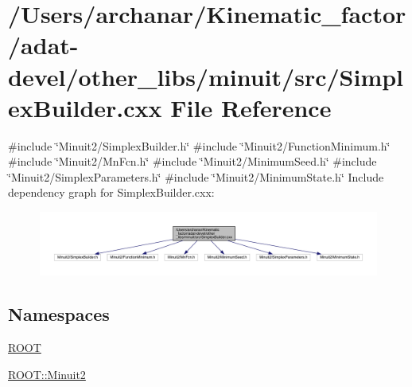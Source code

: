 \hypertarget{adat-devel_2other__libs_2minuit_2src_2SimplexBuilder_8cxx}{}\section{/\+Users/archanar/\+Kinematic\+\_\+factor/adat-\/devel/other\+\_\+libs/minuit/src/\+Simplex\+Builder.cxx File Reference}
\label{adat-devel_2other__libs_2minuit_2src_2SimplexBuilder_8cxx}
{\ttfamily \#include \char`\"{}Minuit2/\+Simplex\+Builder.\+h\char`\"{}}\newline
{\ttfamily \#include \char`\"{}Minuit2/\+Function\+Minimum.\+h\char`\"{}}\newline
{\ttfamily \#include \char`\"{}Minuit2/\+Mn\+Fcn.\+h\char`\"{}}\newline
{\ttfamily \#include \char`\"{}Minuit2/\+Minimum\+Seed.\+h\char`\"{}}\newline
{\ttfamily \#include \char`\"{}Minuit2/\+Simplex\+Parameters.\+h\char`\"{}}\newline
{\ttfamily \#include \char`\"{}Minuit2/\+Minimum\+State.\+h\char`\"{}}\newline
Include dependency graph for Simplex\+Builder.\+cxx\+:
\nopagebreak
\begin{figure}[H]
\begin{center}
\leavevmode
\includegraphics[width=350pt]{de/d41/adat-devel_2other__libs_2minuit_2src_2SimplexBuilder_8cxx__incl}
\end{center}
\end{figure}
\subsection*{Namespaces}
\begin{DoxyCompactItemize}
\item 
 \mbox{\hyperlink{namespaceROOT}{R\+O\+OT}}
\item 
 \mbox{\hyperlink{namespaceROOT_1_1Minuit2}{R\+O\+O\+T\+::\+Minuit2}}
\end{DoxyCompactItemize}
